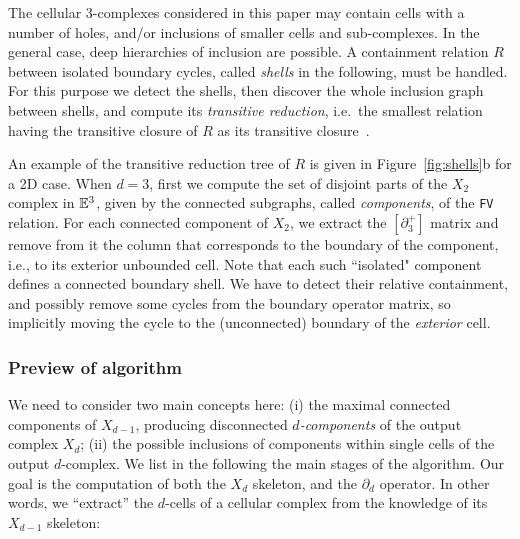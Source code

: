 The cellular 3-complexes considered in this paper may contain cells with a number of holes, and/or inclusions of smaller cells and sub-complexes. 
In the general case, deep hierarchies of inclusion are possible.
A containment relation $R$ between isolated boundary cycles, called \emph{shells} in the following, must be handled. For this purpose we detect the shells, then discover the whole inclusion graph between shells, and compute its \emph{transitive reduction}, i.e.~the smallest relation having the transitive closure of $R$ as its transitive closure~\cite{doi:10.1137/0201008}. 

An example of the transitive reduction tree of $R$ is given in Figure~\ref{fig:shells}b for a 2D case.
When $d=3$, first we compute the set of disjoint parts of the $X_2$ complex in $\mathbb{E}^3$, given by the connected subgraphs, called \emph{components}, of the \texttt{FV} relation. For each connected component of $X_2$, we  extract the $[\partial_3^+]$ matrix  {and remove  from it the column that corresponds to the boundary of the component, i.e., to its exterior unbounded cell}. Note that each such ``isolated" component defines a connected boundary shell. We have to detect their relative containment, and possibly remove some cycles from the boundary operator matrix, so implicitly moving the cycle to the (unconnected) boundary of the \emph{exterior} cell.


\subsubsection{Preview of algorithm}

We need to consider two main concepts here: (i) the {maximal} connected components of $X_{d-1}$, producing {disconnected} \emph{$d$-components} of the output complex $X_d$; (ii) the possible inclusions of components within single cells of the output $d$-complex.  We list in the following the main stages of  the algorithm. Our goal is the computation of both the $X_d$ skeleton, and the $\partial_d$ operator. In other words, we ``extract'' the $d$-cells of a cellular complex from the knowledge of its $X_{d-1}$ skeleton:

